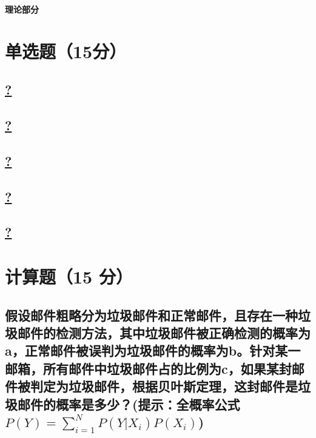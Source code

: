 \documentclass[a4paper]{article}
\begin{document}
\courseheader
{}
\vspace{3mm}
\centerline{\textbf{\Large{理论部分}}}

\section{单选题（15分）}
\subsection{\underline{?}}

\subsection{\underline{?}}

\subsection{\underline{?}}

\subsection{\underline{?}}

\subsection{\underline{?}}

\section{计算题（15 分）}



\subsection{假设邮件粗略分为垃圾邮件和正常邮件，且存在一种垃圾邮件的检测方法，其中垃圾邮件被正确检测的概率为a，正常邮件被误判为垃圾邮件的概率为b。针对某一邮箱，所有邮件中垃圾邮件占的比例为c，如果某封邮件被判定为垃圾邮件，根据贝叶斯定理，这封邮件是垃圾邮件的概率是多少？\newline(提示：全概率公式$P(Y)=\sum^{N}_{i=1}P(Y|X_i)P(X_i)$)}
\end{document}
